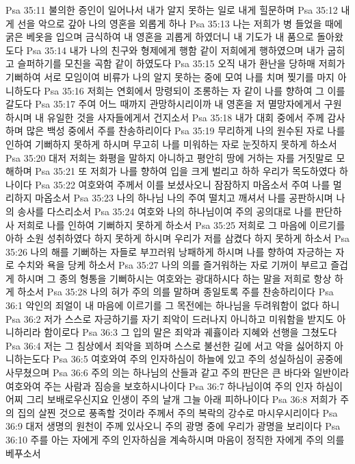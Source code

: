 Psa 35:11  불의한 증인이 일어나서 내가 알지 못하는 일로 내게 힐문하며
Psa 35:12  내게 선을 악으로 갚아 나의 영혼을 외롭게 하나
Psa 35:13  나는 저희가 병 들었을 때에 굵은 베옷을 입으며 금식하여 내 영혼을 괴롭게 하였더니 내 기도가 내 품으로 돌아왔도다
Psa 35:14  내가 나의 친구와 형제에게 행함 같이 저희에게 행하였으며 내가 굽히고 슬퍼하기를 모친을 곡함 같이 하였도다
Psa 35:15  오직 내가 환난을 당하매 저희가 기뻐하여 서로 모임이여 비류가 나의 알지 못하는 중에 모여 나를 치며 찢기를 마지 아니하도다
Psa 35:16  저희는 연회에서 망령되이 조롱하는 자 같이 나를 향하여 그 이를 갈도다
Psa 35:17  주여 어느 때까지 관망하시리이까 내 영혼을 저 멸망자에게서 구원하시며 내 유일한 것을 사자들에게서 건지소서
Psa 35:18  내가 대회 중에서 주께 감사하며 많은 백성 중에서 주를 찬송하리이다
Psa 35:19  무리하게 나의 원수된 자로 나를 인하여 기뻐하지 못하게 하시며 무고히 나를 미워하는 자로 눈짓하지 못하게 하소서
Psa 35:20  대저 저희는 화평을 말하지 아니하고 평안히 땅에 거하는 자를 거짓말로 모해하며
Psa 35:21  또 저희가 나를 향하여 입을 크게 벌리고 하하 우리가 목도하였다 하나이다
Psa 35:22  여호와여 주께서 이를 보셨사오니 잠잠하지 마옵소서 주여 나를 멀리하지 마옵소서
Psa 35:23  나의 하나님 나의 주여 떨치고 깨셔서 나를 공판하시며 나의 송사를 다스리소서
Psa 35:24  여호와 나의 하나님이여 주의 공의대로 나를 판단하사 저희로 나를 인하여 기뻐하지 못하게 하소서
Psa 35:25  저희로 그 마음에 이르기를 아하 소원 성취하였다 하지 못하게 하시며 우리가 저를 삼켰다 하지 못하게 하소서
Psa 35:26  나의 해를 기뻐하는 자들로 부끄러워 낭패하게 하시며 나를 향하여 자긍하는 자로 수치와 욕을 당케 하소서
Psa 35:27  나의 의를 즐거워하는 자로 기꺼이 부르고 즐겁게 하시며 그 종의 형통을 기뻐하시는 여호와는 광대하시다 하는 말을 저희로 항상 하게 하소서
Psa 35:28  나의 혀가 주의 의를 말하며 종일토록 주를 찬송하리이다
Psa 36:1  악인의 죄얼이 내 마음에 이르기를 그 목전에는 하나님을 두려워함이 없다 하니
Psa 36:2  저가 스스로 자긍하기를 자기 죄악이 드러나지 아니하고 미워함을 받지도 아니하리라 함이로다
Psa 36:3  그 입의 말은 죄악과 궤휼이라 지혜와 선행을 그쳤도다
Psa 36:4  저는 그 침상에서 죄악을 꾀하며 스스로 불선한 길에 서고 악을 싫어하지 아니하는도다
Psa 36:5  여호와여 주의 인자하심이 하늘에 있고 주의 성실하심이 공중에 사무쳤으며
Psa 36:6  주의 의는 하나님의 산들과 같고 주의 판단은 큰 바다와 일반이라 여호와여 주는 사람과 짐승을 보호하시나이다
Psa 36:7  하나님이여 주의 인자 하심이 어찌 그리 보배로우신지요 인생이 주의 날개 그늘 아래 피하나이다
Psa 36:8  저희가 주의 집의 살찐 것으로 풍족할 것이라 주께서 주의 복락의 강수로 마시우시리이다
Psa 36:9  대저 생명의 원천이 주께 있사오니 주의 광명 중에 우리가 광명을 보리이다
Psa 36:10  주를 아는 자에게 주의 인자하심을 계속하시며 마음이 정직한 자에게 주의 의를 베푸소서
